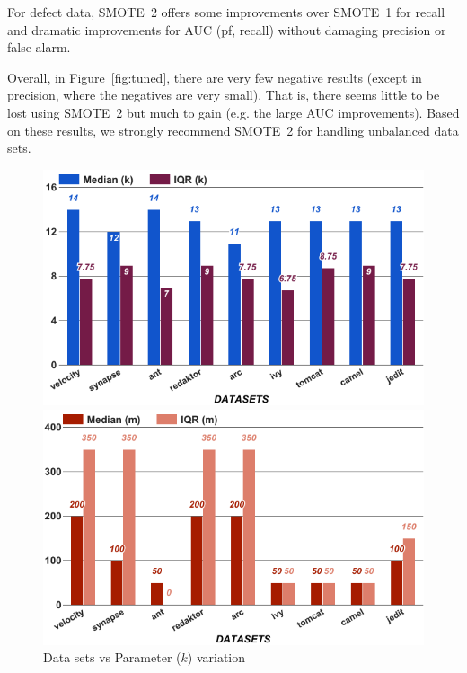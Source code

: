 \begin{lesson1}
    For defect data, SMOTE~2  
 offers   some  improvements over SMOTE~1 for recall
 and dramatic improvements for AUC (pf, recall) without damaging precision or false
 alarm.
\end{lesson1}

Overall, in  Figure~\ref{fig:tuned},
there are very few negative results
(except in precision, where the negatives
are very small). That is, there
seems little to be lost using SMOTE~2
but much to gain (e.g. the large AUC improvements).
Based on these results, we strongly
recommend SMOTE~2 for handling unbalanced
data sets.

\begin{figure}[!t]
    \centering
    \begin{minipage}{.33\textwidth}
        \captionsetup{justification=centering,singlelinecheck=off}
        \includegraphics[width=.95\linewidth]{./fig/k.png}
        \caption{Data sets vs Parameter ($k$) variation}
        \label{RQ3:k}
    \end{minipage}%
    \begin{minipage}{.33\textwidth}
        \captionsetup{labelsep=space,justification=centering,singlelinecheck=off}
        \includegraphics[width=.95\linewidth]{./fig/m.png}

\end{minipage}
\end{figure}
